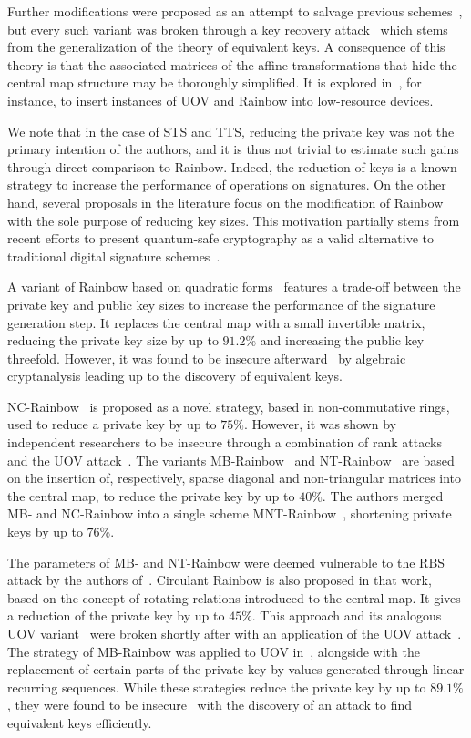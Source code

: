 \documentclass[12pt, a4paper, oneside]{memoir}
\theoremstyle{definition}
\begin{document}
Further modifications were proposed as an attempt to salvage previous schemes~\cite{Tsujii:201005}, but every such variant was broken through a key recovery attack~\cite{Thomae:201207} which stems from the generalization of the theory of equivalent keys. A consequence of this theory is that the associated matrices of the affine transformations that hide the central map structure may be thoroughly simplified. It is explored in~\cite{Czypek:201209}, for instance, to insert instances of UOV and Rainbow into low-resource devices.

We note that in the case of STS and TTS, reducing the private key was not the primary intention of the authors, and it is thus not trivial to estimate such gains through direct comparison to Rainbow. Indeed, the reduction of keys is a known strategy to increase the performance of operations on signatures. On the other hand, several proposals in the literature focus on the modification of Rainbow with the sole purpose of reducing key sizes. This motivation partially stems from recent efforts to present quantum-safe cryptography as a valid alternative to traditional digital signature schemes~\cite{Bernstein:2008}.

A variant of Rainbow based on quadratic forms~\cite{Yasuda:201306} features a trade-off between the private key and public key sizes to increase the performance of the signature generation step. It replaces the central map with a small invertible matrix, reducing the private key size by up to $91.2\%$ and increasing the public key threefold. However, it was found to be insecure afterward~\cite{Hashimoto:201601} by algebraic cryptanalysis leading up to the discovery of equivalent keys.

NC-Rainbow~\cite{Yasuda:201202} is proposed as a novel strategy, based in non-commutative rings, used to reduce a private key by up to $75\%$. However, it was shown by independent researchers to be insecure through a combination of rank attacks and the UOV attack~\cite{Thomae:201209,Hashimoto:201501}. The variants MB-Rainbow~\cite{Yasuda:201305} and NT-Rainbow~\cite{Yasuda:201404} are based on the insertion of, respectively, sparse diagonal and non-triangular matrices into the central map, to reduce the private key by up to $40\%$. The authors merged MB- and NC-Rainbow into a single scheme MNT-Rainbow~\cite{Yasuda:201409}, shortening private keys by up to $76\%$.

The parameters of MB- and NT-Rainbow were deemed vulnerable to the RBS attack by the authors of~\cite{Peng:201706}. Circulant Rainbow is also proposed in that work, based on the concept of rotating relations introduced to the central map. It gives a reduction of the private key by up to $45\%$. This approach and its analogous UOV variant~\cite{Peng:201803} were broken shortly after with an application of the UOV attack~\cite{Hashimoto:201903}. The strategy of MB-Rainbow was applied to UOV in~\cite{Tan:201511}, alongside with the replacement of certain parts of the private key by values generated through linear recurring sequences. While these strategies reduce the private key by up to $89.1\%$, they were found to be insecure~\cite{Park:201803} with the discovery of an attack to find equivalent keys efficiently.
\end{document}
